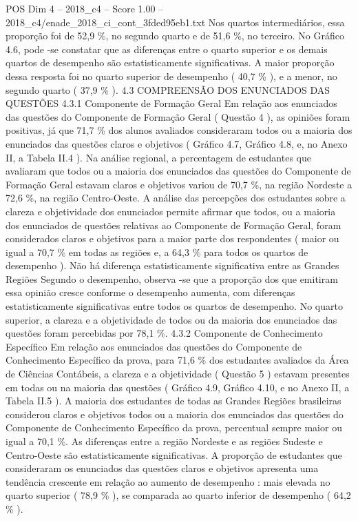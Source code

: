 \begin{textsample}{POS Dim 4 – 2018\_c4 – Score 1.00 – 2018\_c4/enade\_2018\_ci\_cont\_3fded95eb1.txt}
Nos quartos intermediários, essa proporção foi de 52,9 \%, no segundo quarto e de 51,6 \%, no terceiro.
No Gráfico 4.6, pode -se constatar que as diferenças entre o quarto superior e os demais quartos de desempenho são estatisticamente significativas.
A maior proporção dessa resposta foi no quarto superior de desempenho ( 40,7 \% ), e a menor, no segundo quarto ( 37,9 \% ). 4.3 COMPREENSÃO DOS ENUNCIADOS DAS QUESTÕES 4.3.1 Componente de Formação Geral Em relação aos enunciados das questões do Componente de Formação Geral ( Questão 4 ), as opiniões foram positivas, já que 71,7 \% dos alunos avaliados consideraram todos ou a maioria dos enunciados das questões claros e objetivos ( Gráfico 4.7, Gráfico 4.8, e, no Anexo II, a Tabela II.4 ).
Na análise regional, a percentagem de estudantes que avaliaram que todos ou a maioria dos enunciados das questões do Componente de Formação Geral estavam claros e objetivos variou de 70,7 \%, na região Nordeste a 72,6 \%, na região Centro-Oeste.
A análise das percepções dos estudantes sobre a clareza e objetividade dos enunciados permite afirmar que todos, ou a maioria dos enunciados de questões relativas ao Componente de Formação Geral, foram considerados claros e objetivos para a maior parte dos respondentes ( maior ou igual a 70,7 \% em todas as regiões e, a 64,3 \% para todos os quartos de desempenho ).
Não há diferença estatisticamente significativa entre as Grandes Regiões Segundo o desempenho, observa -se que a proporção dos que emitiram essa opinião cresce conforme o desempenho aumenta, com diferenças estatisticamente significativas entre todos os quartos de desempenho.
No quarto superior, a clareza e a objetividade de todos ou da maioria dos enunciados das questões foram percebidas por 78,1 \%. 4.3.2 Componente de Conhecimento Específico Em relação aos enunciados das questões do Componente de Conhecimento Específico da prova, para 71,6 \% dos estudantes avaliados da Área de Ciências Contábeis, a clareza e a objetividade ( Questão 5 ) estavam presentes em todas ou na maioria das questões ( Gráfico 4.9, Gráfico 4.10, e no Anexo II, a Tabela II.5 ).
A maioria dos estudantes de todas as Grandes Regiões brasileiras considerou claros e objetivos todos ou a maioria dos enunciados das questões do Componente de Conhecimento Específico da prova, percentual sempre maior ou igual a 70,1 \%.
As diferenças entre a região Nordeste e as regiões Sudeste e Centro-Oeste são estatisticamente significativas.
A proporção de estudantes que consideraram os enunciados das questões claros e objetivos apresenta uma tendência crescente em relação ao aumento de desempenho : mais elevada no quarto superior ( 78,9 \% ), se comparada ao quarto inferior de desempenho ( 64,2 \% ).

\end{textsample}
